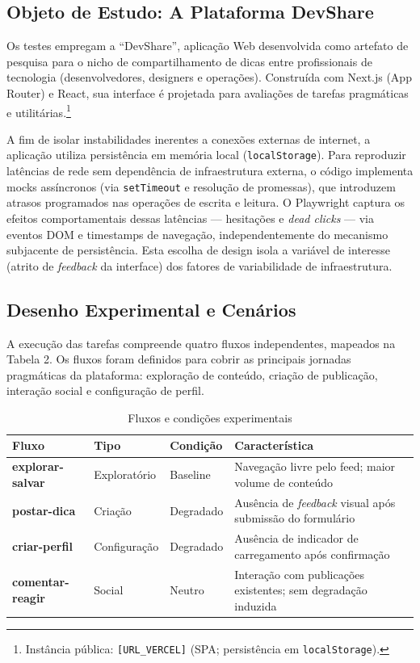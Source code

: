 \documentclass[12pt]{article}
\begin{document}
\subsection{Objeto de Estudo: A Plataforma DevShare}

Os testes empregam a ``DevShare'', aplicação Web desenvolvida como artefato de pesquisa para o nicho de compartilhamento de dicas entre profissionais de tecnologia (desenvolvedores, designers e operações). Construída com Next.js (App Router) e React, sua interface é projetada para avaliações de tarefas pragmáticas e utilitárias.\footnote{Instância pública: \texttt{[URL\_VERCEL]} (SPA; persistência em \texttt{localStorage}).}

A fim de isolar instabilidades inerentes a conexões externas de internet, a aplicação utiliza persistência em memória local (\texttt{localStorage}). Para reproduzir latências de rede sem dependência de infraestrutura externa, o código implementa mocks assíncronos (via \texttt{setTimeout} e resolução de promessas), que introduzem atrasos programados nas operações de escrita e leitura. O Playwright captura os efeitos comportamentais dessas latências --- hesitações e \textit{dead clicks} --- via eventos DOM e timestamps de navegação, independentemente do mecanismo subjacente de persistência. Esta escolha de design isola a variável de interesse (atrito de \textit{feedback} da interface) dos fatores de variabilidade de infraestrutura.


\subsection{Desenho Experimental e Cenários}

A execução das tarefas compreende quatro fluxos independentes, mapeados na Tabela 2. Os fluxos foram definidos para cobrir as principais jornadas pragmáticas da plataforma: exploração de conteúdo, criação de publicação, interação social e configuração de perfil.

\begin{table}[htbp]
  \centering
  \caption{Fluxos e condições experimentais}
  \begin{tabular}{p{2.8cm} p{2.5cm} p{2cm} p{5.2cm}}
    \toprule
    \textbf{Fluxo} & \textbf{Tipo} & \textbf{Condição} & \textbf{Característica} \\
    \midrule
    \textbf{explorar-salvar}  & Exploratório & Baseline  & Navegação livre pelo feed; maior volume de conteúdo \\
    \textbf{postar-dica}      & Criação      & Degradado & Ausência de \textit{feedback} visual após submissão do formulário \\
    \textbf{criar-perfil}     & Configuração & Degradado & Ausência de indicador de carregamento após confirmação \\
    \textbf{comentar-reagir}  & Social       & Neutro     & Interação com publicações existentes; sem degradação induzida \\
    \bottomrule
  \end{tabular}
\end{table}
\end{document}
